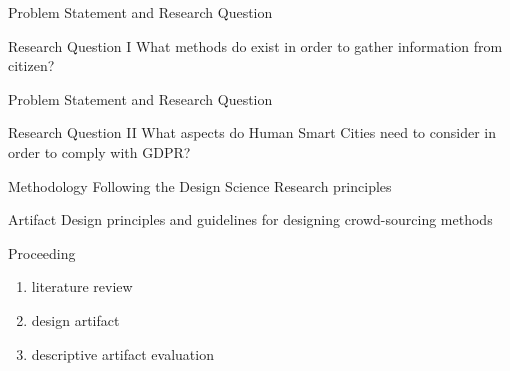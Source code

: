 \documentclass{beamer}
\begin{document}
\begin{frame}{Problem Statement and Research Question}
	\begin{block}{Research Question I}
		What methods do exist in order to gather information from citizen?
	\end{block}
\end{frame}

\begin{frame}{Problem Statement and Research Question}
	\begin{block}{Research Question II}
		What aspects do Human Smart Cities need to consider in order to comply with GDPR?
	\end{block}
\end{frame}

\begin{frame}{Methodology}
	Following the Design Science Research principles
	\begin{block}{Artifact}
		Design principles and guidelines for designing crowd-sourcing methods
	\end{block}
	\begin{block}{Proceeding}
		\begin{enumerate}[]
			\item literature review
			\item design artifact
			\item descriptive artifact evaluation
		\end{enumerate}
	\end{block}
\end{frame}
\end{document}
